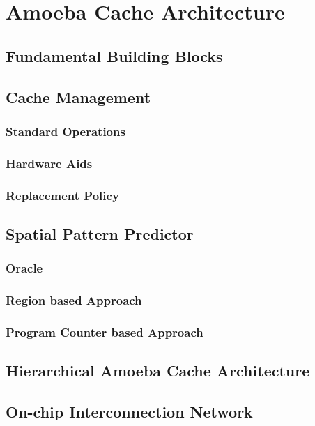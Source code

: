%
%

\chapter{Amoeba Cache Architecture}
\label{chap:ac_architecture}

\section{Fundamental Building Blocks}

\section{Cache Management}
\subsection{Standard Operations}
\subsection{Hardware Aids}
\subsection{Replacement Policy}

\section{Spatial Pattern Predictor}
\subsection{Oracle}
\subsection{Region based Approach}
\subsection{Program Counter based Approach}

\section{Hierarchical Amoeba Cache Architecture}

\section{On-chip Interconnection Network}

